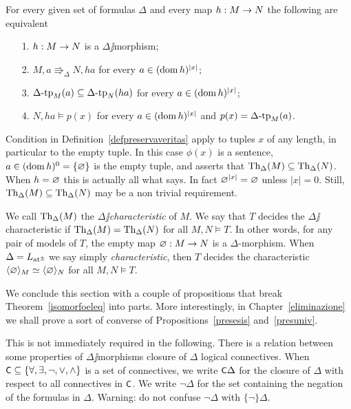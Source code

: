 \documentclass[creche.tex]{subfiles}
\begin{document}
\begin{proposition}\label{oss_Delta-morfismi}
For every given set of formulas $\Delta$ and every map $h:M\rightarrow N$ the following are equivalent
\begin{itemize}
\item[1.] $h:M\rightarrow N$ is a $\Delta\jj$morphism;
\item[2.] $M,a\Rrightarrow_\Delta N,ha$  for every $a\in(\mathop{\rm dom} h)^{|x|}$;
\item[3.] $\Delta\mbox{-}\textrm{tp}_M(a)\subseteq\Delta\mbox{-}\textrm{tp}_N(ha)$ for every $a\in(\mathop{\rm dom} h)^{|x|}$;
\item[4.] $N,ha\models p(x)$ for every $a\in(\mathop{\rm dom} h)^{|x|}$ and $p(x)=\Delta\mbox{-}\textrm{tp}_M(a)$.\QED
\end{itemize}
\end{proposition}



\begin{remark}\label{rmk_characteristic}
Condition  in Definition~\ref{defpreservaveritas} apply to tuples $x$ of any length, in particular to the empty tuple. In this case $\phi(x)$ is a sentence, $a\in(\mathop{\rm dom} h)^0=\{\varnothing\}$ is the empty tuple, and  asserts that $\textrm{Th}_\Delta(M)\subseteq\textrm{Th}_\Delta(N)$. When $h=\varnothing$ this is actually all what  says. In fact $\varnothing^{|x|}=\varnothing$ unless $|x|=0$. Still,  $\textrm{Th}_\Delta(M)\subseteq\textrm{Th}_\Delta(N)$ may be a non trivial requirement.\QED
\end{remark}


\begin{definition}\label{def_characteristic}
We call $\textrm{Th}_\Delta(M)$ the \emph{$\Delta\jj$characteristic} of $M$. We say that $T$  decides the $\Delta\jj$characteristic if $\textrm{Th}_\Delta(M)=\textrm{Th}_\Delta(N)$ for all $M,N\models T$. In other words, for any pair of models of $T$, the empty map $\varnothing:M\to N$ is a $\Delta$-morphism. When $\Delta=L_{{\tiny\rm at^\pm}}\hskip-.3ex$ we say simply \emph{characteristic}, then $T$ decides the characteristic $\langle\varnothing\rangle_M\simeq\langle\varnothing\rangle_N$ for all $M,N\models T$.\QED
\end{definition}



We conclude this section with a couple of propositions that break Theorem~\ref{isomorfoeleq} into parts. More interestingly, in Chapter~\ref{eliminazione} we shall prove a sort of converse of Propositions~\ref{presesis} and~\ref{presuniv}.

This is not immediately required in the following. There is a relation between some properties of $\Delta\jj$morphisms closure of $\Delta$ logical connectives. When $\textsf{\small C}\subseteq\{\forall,\exists,\neg,\vee,\wedge\}$ is a set of connectives, we write \emph{$\textsf{\small C}\Delta$} for the closure of $\Delta$ with respect to all connectives in $\textsf{\small C}$. We write \emph{$\neg\Delta$} for the set containing the negation of the formulas in $\Delta$. Warning: do not confuse $\neg\Delta$ with $\{\neg\}\Delta$.
\end{document}
